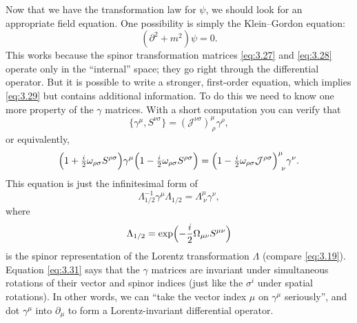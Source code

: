 Now that we have the transformation law for $\psi$, we should look for an
appropriate field equation.  One possibility is simply the Klein--Gordon
equation:
\begin{equation}
  (\partial^2 + m^2)\psi = 0 .
  \label{eq:3.29}
\end{equation}
This works because the spinor transformation matrices \eqref{eq:3.27} and
\eqref{eq:3.28} operate only in the ``internal'' space; they go right through
the differential operator.  But it is possible to write a stronger, first-order
equation, which implies \eqref{eq:3.29} but contains additional information.
To do this we need to know one more property of the $\gamma$ matrices.  With a
short computation you can verify that
\begin{equation}
  \{\gamma^\mu, S^{\nu\sigma}\} = (\mathcal{J}^{\nu\sigma})^{\mu}_{\ \rho}
    \gamma^\rho,
  \label{eq:3.30}
\end{equation}
or equivalently,
\begin{equation}
  \Bigl( 1 + \tfrac{i}{2}\omega_{\rho\sigma}S^{\rho\sigma} \Bigr)
    \gamma^\mu
    \Bigl( 1 - \tfrac{i}{2}\omega_{\rho\sigma}S^{\rho\sigma} \Bigr)
  = \Bigl( 1 - \tfrac{i}{2}\omega_{\rho\sigma}\mathcal{J}^{\rho\sigma}
    \Bigr)^{\mu}_{\ \nu}\gamma^\nu .
\end{equation}
This equation is just the infinitesimal form of
\begin{equation}
  \Lambda^{-1}_{1/2}\gamma^\mu\Lambda_{1/2}
    = \Lambda^{\mu}_{\ \nu}\gamma^\nu,
  \label{eq:3.31}
\end{equation}
where
\begin{equation}
  \Lambda_{1/2} = \exp\Bigl( -\frac{i}{2}\Omega_{\mu\nu}S^{\mu\nu} \Bigr)
  \label{eq:3.32}
\end{equation}
is the spinor representation of the Lorentz transformation $\Lambda$ (compare
\eqref{eq:3.19}).  Equation \eqref{eq:3.31} says that the $\gamma$ matrices
are invariant under simultaneous rotations of their vector and spinor indices
(just like the $\sigma^i$ under spatial rotations).  In other words, we can
``take the vector index $\mu$ on $\gamma^\mu$ seriously'', and dot
$\gamma^\mu$ into $\partial_\mu$ to form a Lorentz-invariant differential
operator.

